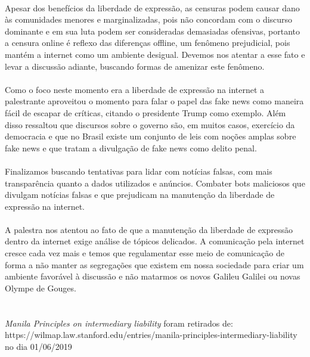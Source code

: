 \documentclass[12pt]{article}
\begin{document}
	\paragraph{}		
		Apesar dos benefícios da liberdade de expressão, as censuras podem
		causar dano às comunidades menores e marginalizadas, pois não concordam com 
		o discurso dominante e em sua luta podem ser consideradas demasiadas
		ofensivas, portanto a censura online é reflexo das diferenças offline, um
		fenômeno prejudicial, pois mantém a internet como um ambiente desigual.
		Devemos nos atentar a esse fato e levar a discussão adiante, buscando
		formas de amenizar este fenômeno.
	\paragraph{}
		Como o foco neste momento era a liberdade de expressão na internet a 
		palestrante aproveitou o momento para falar o papel das fake news como
		maneira fácil de escapar de críticas, citando o presidente Trump como exemplo.	
		Além disso ressaltou que discursos sobre o governo são, em muitos casos,
		exercício da democracia e que no Brasil existe um conjunto de leis com noções 
		amplas sobre fake news e que tratam a divulgação de fake news como delito 
		penal.
	\paragraph{}
		Finalizamos buscando tentativas para lidar com notícias falsas, com
		mais transparência quanto a dados utilizados e anúncios. Combater bots 
		maliciosos que divulgam notícias falsas e que prejudicam na manutenção
		da liberdade de expressão na internet.
	\paragraph{}
		A palestra nos atentou ao fato de que a manutenção da liberdade de expressão
		dentro da internet exige análise de tópicos delicados. A comunicação pela
		internet cresce cada vez mais e temos que regulamentar esse meio de
		comunicação de forma a não manter as segregações que existem em nossa
		sociedade para criar um ambiente favorável à discussão e não matarmos os
		novos Galileu Galilei ou novas Olympe de Gouges. 	
	\\\\
	\paragraph{}
		\textit{Manila Principles on intermediary liability} foram
		retirados de:\\
		https://wilmap.law.stanford.edu/entries/manila-principles-intermediary-liability
		\\
		no dia 01/06/2019
\end{document}
